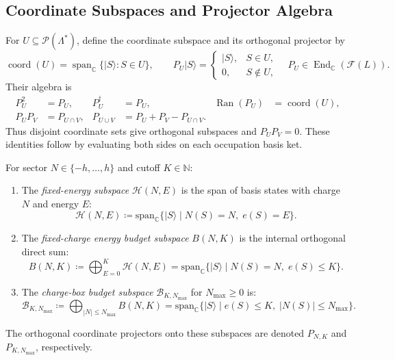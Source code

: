 \subsection{Coordinate Subspaces and Projector Algebra}
For $U\subseteq\mathcal P(\Lambda^*)$, define the coordinate subspace and its orthogonal projector by
\begin{equation}
\operatorname{coord}(U)=\operatorname{span}_{\mathbb C}\{|S\rangle:S\in U\},\qquad
P_U|S\rangle=\begin{cases}|S\rangle,&S\in U,\\0,&S\notin U,\end{cases}
\quad P_U\in\operatorname{End}_{\mathbb C}(\mathcal F(L)).
\end{equation}
Their algebra is
\begin{align}
P_U^2&=P_U, & P_U^\dagger&=P_U, & \operatorname{Ran}(P_U)&=\operatorname{coord}(U),\\
P_UP_V&=P_{U\cap V}, & P_{U\cup V}&=P_U+P_V-P_{U\cap V}.
\end{align}
Thus disjoint coordinate sets give orthogonal subspaces and $P_UP_V=0$. These identities follow by evaluating both sides on each occupation basis ket.


\begin{definition}
\label{def:budget_subspace}
For sector $N \in \{-h, \dots, h\}$ and cutoff $K \in \mathbb{N}$:
\begin{enumerate}
    \item The \emph{fixed-energy subspace} $\mathcal{H}(N, E)$ is the span of basis states with charge $N$ and energy $E$:
    \begin{equation}
    \mathcal{H}(N, E) \coloneqq \mathrm{span}_{\mathbb{C}} \{ |S\rangle \mid N(S) = N, \; e(S) = E \}.
    \end{equation}
    \item The \emph{fixed-charge energy budget subspace} $B(N, K)$ is the internal orthogonal direct sum:
    \begin{equation}
    B(N, K) \coloneqq \bigoplus_{E=0}^K \mathcal{H}(N, E) = \mathrm{span}_{\mathbb{C}} \{ |S\rangle \mid N(S) = N, \; e(S) \le K \}.
    \end{equation}
    \item The \emph{charge-box budget subspace} $\mathcal{B}_{K, N_{\max}}$ for $N_{\max} \ge 0$ is:
    \begin{equation}
    \mathcal{B}_{K, N_{\max}} \coloneqq \bigoplus_{|N| \le N_{\max}} B(N, K) = \mathrm{span}_{\mathbb{C}} \{ |S\rangle \mid e(S) \le K, \; |N(S)| \le N_{\max} \}.
    \end{equation}
\end{enumerate}
The orthogonal coordinate projectors onto these subspaces are denoted $P_{N, K}$ and $P_{K, N_{\max}}$, respectively.
\end{definition}

